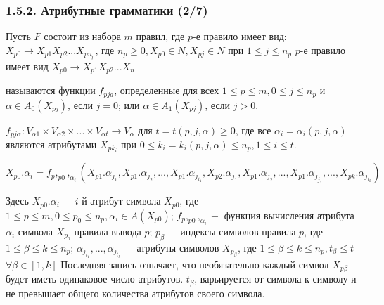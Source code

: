     \begin{frame}
    \frametitle{1.5.2. Атрибутные грамматики (2/7)}
    
        Пусть $F$ состоит из набора $m$ правил, где $p$-е правило имеет вид:
        $X_{p0} \to X_{p1}X_{p2}...X_{pn_{p}}$, где $n_p \geq 0, X_{p0} \in N, X_{pj} \in N$ при $1 \leq j \leq n_p$
        \example $p$-е правило имеет вид $X_{p0} \to X_{p1}X_{p2}...X_n$
        
          называются функции $f_{pja}$, определенные для всех $1 \leq p \leq m, 0 \leq j \leq n_p$ и $\alpha \in A_0(X_{pj})$, если $j = 0$; или $\alpha \in A_1(X_{pj})$, если $j > 0$.
        
        $f_{pj\alpha}: V_{\alpha1} \times V_{\alpha2} \times...\times V_{\alpha t} \to V_{\alpha}$ для $t = t(p,j,\alpha) \geq 0$, где все  $\alpha_i = \alpha_i(p,j,\alpha)$ являются атрибутами $X_{pk_i}$ при $0 \leq k_i = k_i(p,j,\alpha) \leq n_p, 1 \leq i \leq t$. 
        
        \example 
        
        $X_{p0}.\alpha_i = f_p,_{p0},_{\alpha_i}(X_{p1}.\alpha_{j_1},X_{p1}.\alpha_{j_2},...,X_{p1}.\alpha_{j_{t_1}},X_{p2}.\alpha_{j_1}, X_{p1}.\alpha_{j_2},...,X_{p1}.\alpha_{j_{j_2}},...,X_{pk}.\alpha_{j_{t_k}})$
        
        Здесь $X_{p0}.\alpha_{i} - $ $i$-й атрибут символа $X_{p0}$, где $1 \leq p \leq m, 0 \leq p_0 \leq n_p, \alpha_i \in A(X_{p0})$; $f_p,_{p0},_{\alpha_i} - $ функция вычисления атрибута $\alpha_i$ символа $X_{p_0}$ правила вывода $p$; $p_\beta - $ индексы символов правила $p$, где $1 \leq \beta \leq k \leq n_p$; $\alpha_{j_{t_{1}}},...,\alpha_{j_{t_{k}}} - $ атрибуты символов $X_{p_\beta}$, где $1 \leq \beta \leq k \leq n_p, t_\beta \leq t$  $\forall \beta \in [1,k]$
        \remark Последняя запись означает, что необязательно каждый символ $X_{p\beta}$ будет иметь одинаковое число атрибутов. $t_\beta$, варьируется от символа к символу и не превышает общего количества атрибутов своего символа.
    
    \end{frame}

